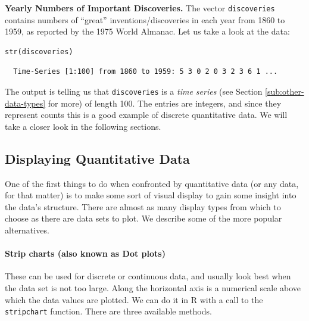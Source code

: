 \documentclass[captions=tableheading]{scrbook}
\begin{document}
\begin{example}
\textbf{Yearly Numbers of Important Discoveries.} The vector \texttt{discoveries} contains numbers of “great” inventions/discoveries in each year from 1860 to 1959, as reported by the 1975 World Almanac. Let us take a look at the data:


\begin{verbatim}
str(discoveries)
\end{verbatim}

\begin{verbatim}
  Time-Series [1:100] from 1860 to 1959: 5 3 0 2 0 3 2 3 6 1 ...
\end{verbatim}

\end{example}

The output is telling us that \texttt{discoveries} is a \emph{time series} (see Section \ref{sub:other-data-types} for more) of length 100. The entries are integers, and since they represent counts this is a good example of discrete quantitative data. We will take a closer look in the following sections.
\subsection{Displaying Quantitative Data}
\label{sec-2-1-2}

\label{sub:Displaying-Quantitative-Data}

One of the first things to do when confronted by quantitative data (or any data, for that matter) is to make some sort of visual display to gain some insight into the data's structure. There are almost as many display types from which to choose as there are data sets to plot. We describe some of the more popular alternatives. 

\paragraph*{Strip charts (also known as Dot plots)}
\label{par:Strip-charts}

These can be used for discrete or continuous data, and usually look best when the data set is not too large. Along the horizontal axis is a numerical scale above which the data values are plotted. We can do it in \textsf{R} with a call to the \texttt{stripchart} function. There are three available methods.
\end{document}
